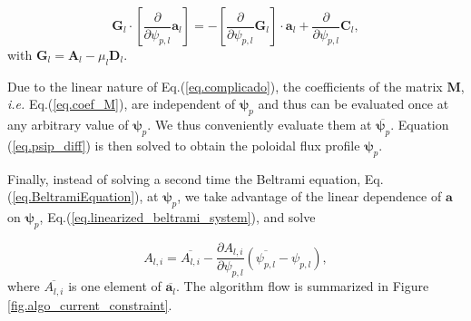 \documentclass[my_thesis.tex]{subfiles}
\begin{document}
\begin{equation}
	\mathbf{G}_l \cdot \left[\frac{\partial}{\partial\psi_{p,l}}\mathbf{a}_l\right] = - \left[\frac{\partial}{\partial\psi_{p,l}}\mathbf{G}_l\right] \cdot \mathbf{a}_l + \frac{\partial}{\partial\psi_{p,l}}\mathbf{C}_l,\label{eq.perturbed_matrix}
\end{equation}
with $\mathbf{G}_l = \mathbf{A}_l-\mu_l\mathbf{D}_l$.

Due to the linear nature of Eq.(\ref{eq.complicado}), the coefficients of the matrix $\mathbf{M}$, \textit{i.e.} Eq.(\ref{eq.coef_M}), are independent of $\bm{\psi}_p$ and thus can be evaluated once at any arbitrary value of $\bm{\psi}_p$. We thus conveniently evaluate them at $\overbar{\bm{\psi}_p}$. Equation (\ref{eq.psip_diff}) is then solved to obtain the poloidal flux profile $\bm{\psi}_p$. 

Finally, instead of solving a second time the Beltrami equation, Eq.(\ref{eq.BeltramiEquation}), at $\bm{\psi}_p$, we take advantage of the linear dependence of $\mathbf{a}$ on $\bm{\psi}_p$, Eq.(\ref{eq.linearized_beltrami_system}), and solve  

\begin{equation}
	A_{l,i} = \overbar{A_{l,i}} - \frac{\partial {A_{l,i}}}{\partial {\psi_{p,l}}} (\overbar{\psi_{p,l}} - \psi_{p,l}),\label{eq.NewtonStep_Solution}
\end{equation}
where $\overbar{A_{l,i}}$ is one element of $\overbar{\bm{a}_l}$. The algorithm flow is summarized in Figure \ref{fig.algo_current_constraint}.
\end{document}
